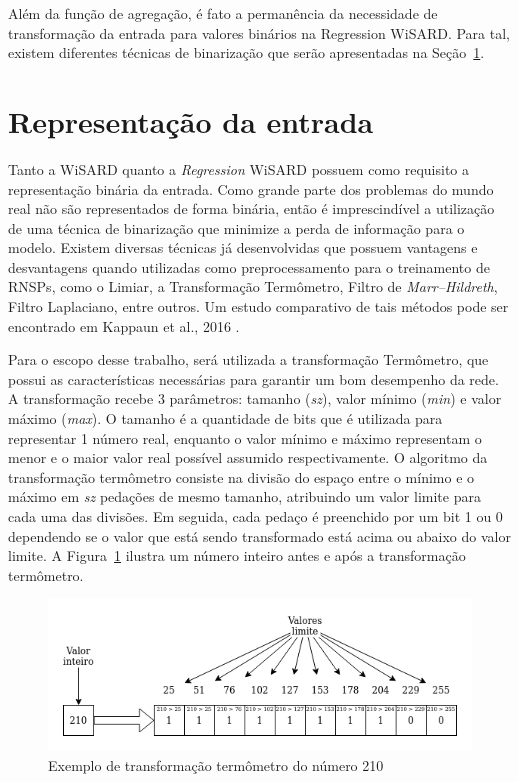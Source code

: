 Além da função de agregação, é fato a permanência da necessidade de transformação da entrada para valores binários na Regression WiSARD. Para tal, existem diferentes técnicas de binarização que serão apresentadas na Seção~\ref{sec:input_repr}.

\section{Representação da entrada} \label{sec:input_repr}
Tanto a WiSARD quanto a \textit{Regression} WiSARD possuem como requisito a representação binária da entrada. Como grande parte dos problemas do mundo real não são representados de forma binária, então é imprescindível a utilização de uma técnica de binarização que minimize a perda de informação para o modelo. Existem diversas técnicas já desenvolvidas que possuem vantagens e desvantagens quando utilizadas como preprocessamento para o treinamento de RNSPs, como o Limiar, a Transformação Termômetro, Filtro de \textit{Marr–Hildreth}, Filtro Laplaciano, entre outros. Um estudo comparativo de tais métodos pode ser encontrado em Kappaun et al., 2016 \cite{binenctec}.

Para o escopo desse trabalho, será utilizada a transformação Termômetro, que possui as características necessárias para garantir um bom desempenho da rede. A transformação recebe 3 parâmetros: tamanho (\textit{sz}), valor mínimo (\textit{min}) e valor máximo (\textit{max}). O tamanho é a quantidade de bits que é utilizada para representar 1 número real, enquanto o valor mínimo e máximo representam o menor e o maior valor real possível assumido respectivamente. O algoritmo da transformação termômetro consiste na divisão do espaço entre o mínimo e o máximo em \textit{sz} pedações de mesmo tamanho, atribuindo um valor limite para cada uma das divisões. Em seguida, cada pedaço é preenchido por um bit 1 ou 0 dependendo se o valor que está sendo transformado está acima ou abaixo do valor limite. A Figura~\ref{fig:therm_ex} ilustra um número inteiro antes e após a transformação termômetro.

\begin{figure}[!htp] \label{fig:therm_ex}
    \centering
    \includegraphics[width=5.0in]{img/therm_example.png}
    \caption{Exemplo de transformação termômetro do número 210}
\end{figure}

